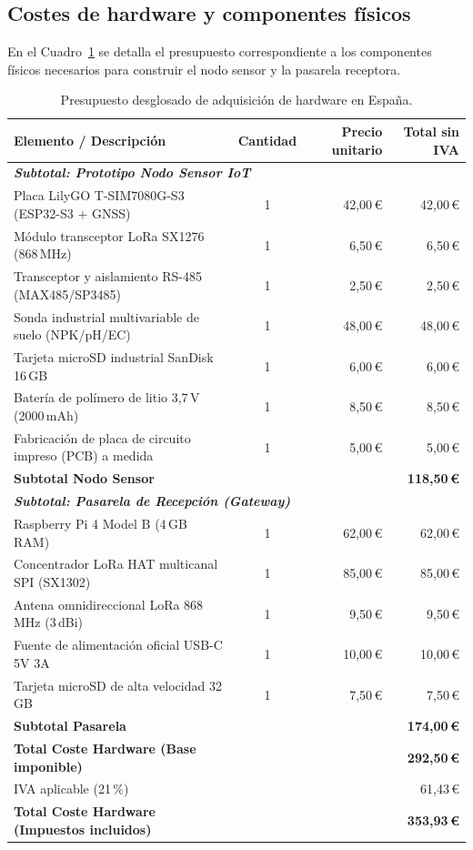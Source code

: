 \subsection{Costes de hardware y componentes físicos}
En el Cuadro~\ref{tab:costes_hardware} se detalla el presupuesto correspondiente a los componentes físicos necesarios para construir el nodo sensor y la pasarela receptora.

\begin{table}[htbp]
\centering
\small
\begin{tabular}{p{5.5cm} c r r}
\hline
\textbf{Elemento / Descripción} & \textbf{Cantidad} & \textbf{Precio unitario} & \textbf{Total sin IVA} \\ \hline
\multicolumn{4}{l}{\textit{\textbf{Subtotal: Prototipo Nodo Sensor IoT}}} \\
Placa LilyGO T-SIM7080G-S3 (ESP32-S3 + GNSS) & 1 & 42,00\,€ & 42,00\,€ \\
Módulo transceptor LoRa SX1276 (868\,MHz) & 1 & 6,50\,€ & 6,50\,€ \\
Transceptor y aislamiento RS-485 (MAX485/SP3485) & 1 & 2,50\,€ & 2,50\,€ \\
Sonda industrial multivariable de suelo (NPK/pH/EC) & 1 & 48,00\,€ & 48,00\,€ \\
Tarjeta microSD industrial SanDisk 16\,GB & 1 & 6,00\,€ & 6,00\,€ \\
Batería de polímero de litio 3,7\,V (2000\,mAh) & 1 & 8,50\,€ & 8,50\,€ \\
Fabricación de placa de circuito impreso (PCB) a medida & 1 & 5,00\,€ & 5,00\,€ \\ \hline
\textbf{Subtotal Nodo Sensor} & & & \textbf{118,50\,€} \\ \hline
\multicolumn{4}{l}{\textit{\textbf{Subtotal: Pasarela de Recepción (Gateway)}}} \\
Raspberry Pi 4 Model B (4\,GB RAM) & 1 & 62,00\,€ & 62,00\,€ \\
Concentrador LoRa HAT multicanal SPI (SX1302) & 1 & 85,00\,€ & 85,00\,€ \\
Antena omnidireccional LoRa 868\,MHz (3\,dBi) & 1 & 9,50\,€ & 9,50\,€ \\
Fuente de alimentación oficial USB-C 5V 3A & 1 & 10,00\,€ & 10,00\,€ \\
Tarjeta microSD de alta velocidad 32\,GB & 1 & 7,50\,€ & 7,50\,€ \\ \hline
\textbf{Subtotal Pasarela} & & & \textbf{174,00\,€} \\ \hline
\textbf{Total Coste Hardware (Base imponible)} & & & \textbf{292,50\,€} \\
IVA aplicable (21\,\%) & & & 61,43\,€ \\ \hline
\textbf{Total Coste Hardware (Impuestos incluidos)} & & & \textbf{353,93\,€} \\ \hline
\end{tabular}
\caption{Presupuesto desglosado de adquisición de hardware en España.}
\label{tab:costes_hardware}
\end{table}

